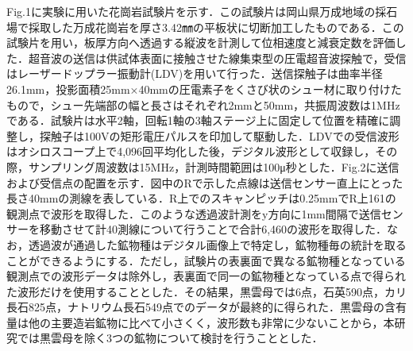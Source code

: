 ﻿%
Fig.1に実験に用いた花崗岩試験片を示す．この試験片は岡山県万成地域の採石場で採取した万成花崗岩を厚さ3.42㎜の平板状に切断加工したものである．この試験片を用い，板厚方向へ透過する縦波を計測して位相速度と減衰定数を評価した．超音波の送信は供試体表面に接触させた線集束型の圧電超音波探触で，受信はレーザードップラー振動計(LDV)を用いて行った．送信探触子は曲率半径26.1mm，投影面積25mm×40mmの圧電素子をくさび状のシュー材に取り付けたもので，シュー先端部の幅と長さはそれぞれ2mmと50mm，共振周波数は1MHzである．試験片は水平2軸，回転1軸の3軸ステージ上に固定して位置を精確に調整し，探触子は100Vの矩形電圧パルスを印加して駆動した．LDVでの受信波形はオシロスコープ上で4,096回平均化した後，デジタル波形として収録し，その際，サンプリング周波数は15MHz，計測時間範囲は100μ秒とした．Fig.2に送信および受信点の配置を示す．図中のRで示した点線は送信センサー直上にとった長さ40mmの測線を表している．R上でのスキャンピッチは0.25mmでR上161の観測点で波形を取得した．このような透過波計測をy方向に1mm間隔で送信センサーを移動させて計40測線について行うことで合計6,460の波形を取得した．なお，透過波が通過した鉱物種はデジタル画像上で特定し，鉱物種毎の統計を取ることができるようにする．ただし，試験片の表裏面で異なる鉱物種となっている観測点での波形データは除外し，表裏面で同一の鉱物種となっている点で得られた波形だけを使用することとした．その結果，黒雲母では6点，石英590点，カリ長石825点，ナトリウム長石549点でのデータが最終的に得られた．黒雲母の含有量は他の主要造岩鉱物に比べて小さくく，波形数も非常に少ないことから，本研究では黒雲母を除く3つの鉱物について検討を行うこととした．
